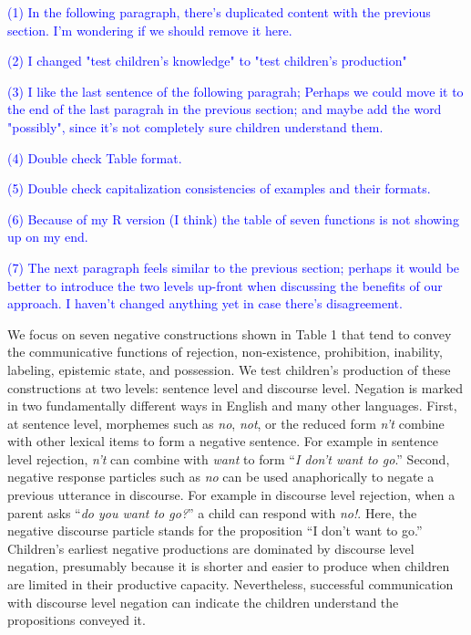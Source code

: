 \documentclass[
  english,
  man,floatsintext]{apa6}
\begin{document}
\textcolor{blue}{(1) In the following paragraph, there's duplicated content with the previous section. I'm wondering if we should remove it here.}

\textcolor{blue}{(2) I changed "test children's knowledge" to "test children's production"}

\textcolor{blue}{(3) I like the last sentence of the following paragrah; Perhaps we could move it to the end of the last paragrah in the previous section; and maybe add the word "possibly", since it's not completely sure children understand them.}

\textcolor{blue}{(4) Double check Table format.}

\textcolor{blue}{(5) Double check capitalization consistencies of examples and their formats.}

\textcolor{blue}{(6) Because of my R version (I think) the table of seven functions is not showing up on my end.}

\textcolor{blue}{(7) The next paragraph feels similar to the previous section; perhaps it would be better to introduce the two levels up-front when discussing the benefits of our approach. I haven't changed anything yet in case there's disagreement.}

We focus on seven negative constructions shown in Table 1 that tend to convey the communicative functions of rejection, non-existence, prohibition, inability, labeling, epistemic state, and possession. We test children's production of these constructions at two levels: sentence level and discourse level. Negation is marked in two fundamentally different ways in English and many other languages. First, at sentence level, morphemes such as \emph{no}, \emph{not}, or the reduced form \emph{n't} combine with other lexical items to form a negative sentence. For example in sentence level rejection, \emph{n't} can combine with \emph{want} to form ``\emph{I don't want to go}.'' Second, negative response particles such as \emph{no} can be used anaphorically to negate a previous utterance in discourse. For example in discourse level rejection, when a parent asks ``\emph{do you want to go?}'' a child can respond with \emph{no!}. Here, the negative discourse particle stands for the proposition ``I don't want to go.'' Children's earliest negative productions are dominated by discourse level negation, presumably because it is shorter and easier to produce when children are limited in their productive capacity. Nevertheless, successful communication with discourse level negation can indicate the children understand the propositions conveyed it.
\end{document}
